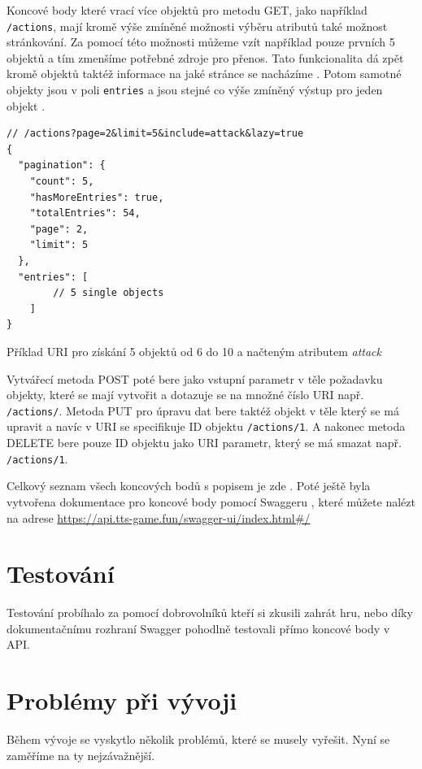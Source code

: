 Koncové body které vrací více objektů pro metodu GET, jako například \texttt{/actions}, mají kromě výše zmíněné možnosti výběru atributů také možnost stránkování. Za pomocí této možnosti můžeme vzít například pouze prvních 5 objektů a tím zmenšíme potřebné zdroje pro přenos. Tato funkcionalita dá zpět kromě objektů taktéž informace na jaké stránce se nacházíme . Potom samotné objekty jsou v poli \texttt{entries} a jsou stejné co výše zmíněný výstup pro jeden objekt .

\begin{listing}[H]
    \begin{verbatim}
// /actions?page=2&limit=5&include=attack&lazy=true
{
  "pagination": {
    "count": 5,
    "hasMoreEntries": true,
    "totalEntries": 54,
    "page": 2,
    "limit": 5
  },
  "entries": [ 
        // 5 single objects
    ]
}
    \end{verbatim}
    \caption{Příklad URI pro získání 5 objektů od 6 do 10 a načteným atributem \textit{attack}}
    \label{code:action:endpoint:multiple}
\end{listing}

Vytvářecí metoda POST poté bere jako vstupní parametr v těle požadavku objekty, které se mají vytvořit a dotazuje se na množné číslo URI např. \texttt{/actions/}. Metoda PUT pro úpravu dat bere taktéž objekt v těle který se má upravit a navíc v URI se specifikuje ID objektu \texttt{/actions/1}. A nakonec metoda DELETE bere pouze ID objektu jako URI parametr, který se má smazat např. \texttt{/actions/1}.

Celkový seznam všech koncových bodů s popisem je zde . Poté ještě byla vytvořena dokumentace pro koncové body pomocí Swaggeru , které můžete nalézt na adrese \url{https://api.tts-game.fun/swagger-ui/index.html#/}


\section{Testování}\label{sec:testing}
Testování probíhalo za pomocí dobrovolníků kteří si zkusili zahrát hru, nebo díky dokumentačnímu rozhraní Swagger  pohodlně testovali přímo koncové body v API.



\section{Problémy při vývoji}\label{sec:impl:problems}
Během vývoje se vyskytlo několik problémů, které se musely vyřešit. Nyní se zaměříme na ty nejzávažnější.

